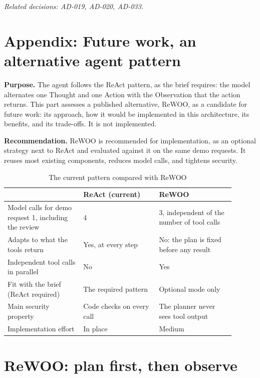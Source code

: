 \documentclass[11pt,letterpaper]{article}
\renewcommand{\_}{\textunderscore\allowbreak}
\begin{document}
{\small\textit{Related decisions: AD-019, AD-020, AD-033.}}

\newpage
\section*{Appendix: Future work, an alternative agent pattern}

\textbf{Purpose.} The agent follows the ReAct pattern, as the brief requires: the model
alternates one Thought and one Action with the Observation that the action returns. This part
assesses a published alternative, ReWOO, as a candidate for future work: its approach, how it
would be implemented in this architecture, its benefits, and its trade-offs. It is not
implemented.

\textbf{Recommendation.} ReWOO is recommended for implementation, as an optional strategy next to
ReAct and evaluated against it on the same demo requests. It reuses most existing components,
reduces model calls, and tightens security.

\begin{table}[H]
\centering
\caption{The current pattern compared with ReWOO}
\label{tab:patterns}
\begin{tabular}{p{0.30\linewidth} p{0.30\linewidth} p{0.30\linewidth}}
\hline
 & \textbf{ReAct (current)} & \textbf{ReWOO} \\
\hline
Model calls for demo request 1, including the review & 4 & 3, independent of the number of tool calls \\
Adapts to what the tools return & Yes, at every step & No: the plan is fixed before any result \\
Independent tool calls in parallel & No & Yes \\
Fit with the brief (ReAct required) & The required pattern & Optional mode only \\
Main security property & Code checks on every call & The planner never sees tool output \\
Implementation effort & In place & Medium \\
\hline
\end{tabular}
\end{table}

\section{ReWOO: plan first, then observe}
\end{document}
